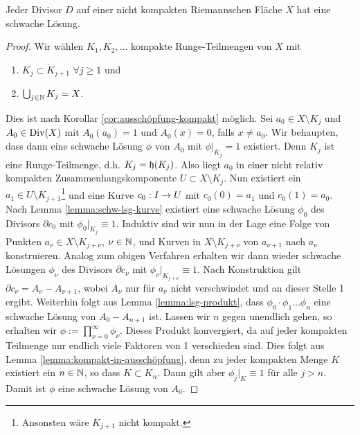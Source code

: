 \begin{lemma}
  \label{lemma:schwache-Lösung-Divisor}
  Jeder Divisor $D$ auf einer nicht kompakten Riemannschen Fläche $X$ hat eine
  schwache Lösung.
\end{lemma}

\begin{proof}
  Wir wählen $K_1, K_2, \dots$ kompakte Runge-Teilmengen von $X$ mit
  \begin{enumerate}
  \item $K_j \subset \mathring{K}_{j+1}$ $\forall j \geq 1$ und
  \item $\bigcup_{j \in \mathbb{N}} K_j = X$.
  \end{enumerate}
  Dies ist nach Korollar \ref{cor:ausschöpfung-kompakt} möglich.
  Sei $a_0 \in X \setminus K_j$ und $A_0 \in \operatorname{Div}(X)$
  mit $A_0(a_0) = 1$ und $A_0(x) = 0$, falls $x \neq a_0$. Wir
  behaupten, dass dann eine schwache Lösung $\phi$ von $A_0$ mit $\phi |_{K_j}
  = 1$ existiert. 
  Denn $K_j$ ist eine Runge-Teilmenge, d.h. $K_j = \mathfrak{h}(K_j)$. Also
  liegt $a_0$ in einer nicht relativ kompakten
  Zusammenhangskomponente $U \subset X \setminus K_j$.
  Nun existiert ein $a_1 \in U \setminus K_{j+1}$\footnote{Ansonsten wäre
  $K_{j+1}$ nicht kompakt.} und eine Kurve $c_0: I \rightarrow U$ mit
  $c_0(0)=a_1$ und $c_0(1) = a_0$. 
  Nach Lemma \ref{lemma:schw-lsg-kurve} existiert eine schwache Lösung
  $\phi_0$ des Divisors $\partial c_0$ mit $\phi_0|_{K_j} \equiv 1$. 
  Induktiv sind wir nun in der Lage eine Folge von Punkten $a_\nu \in
  X \setminus K_{j+ \nu}$, $\nu \in \mathbb{N}$, und Kurven in $X \setminus
  K_{j+\nu}$ von $a_{\nu+1}$ nach $a_\nu$ konstruieren. Analog zum
  obigen Verfahren erhalten wir dann wieder schwache Lösungen
  $\phi_\nu$ des Divisors $\partial c_\nu$ mit $\phi_\nu |_{K_{j+\nu}}
  \equiv 1$. 
  Nach Konstruktion gilt $\partial c_\nu = A_\nu - A_{\nu+1}$, wobei
  $A_\nu$ nur für $a_\nu$ nicht verschwindet und an dieser Stelle 1
  ergibt.
  Weiterhin folgt aus Lemma \ref{lemma:lsg-produkt}, dass $\phi_0 \cdot \phi_1 \dots \phi_n$ eine
  schwache Lösung von $A_0 - A_{n+1}$ ist.
  Lassen wir $n$ gegen unendlich gehen, so erhalten wir $\phi :=
  \prod_{\nu = 0}^\infty \phi_\nu$. Dieses Produkt konvergiert, da
  auf jeder kompakten Teilmenge nur endlich viele Faktoren von 1
  verschieden sind. Dies folgt aus Lemma
  \ref{lemma:kompakt-in-ausschöpfung}, denn zu jeder kompakten Menge
  $K$ existiert ein $n \in \mathbb{N}$, so dass $K \subset K_n$. Dann gilt
  aber $\phi_j |_K \equiv 1$ für alle $j > n$.
  Damit ist $\phi$ eine schwache Lösung von $A_0$.
  

\end{proof}
